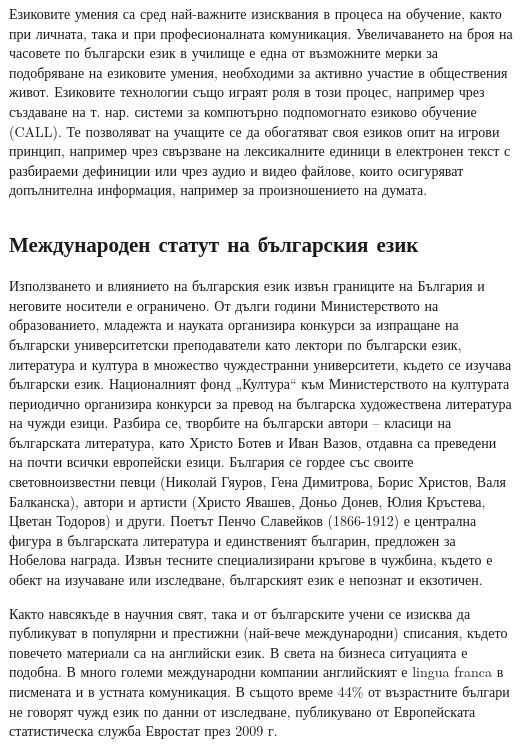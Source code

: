 \documentclass[]{../../metanetpaper}
\begin{document}
\begin{multicols}{2}
Езиковите умения са сред най-важните изисквания в процеса на обучение, както при личната, така и при професионалната комуникация. Увеличаването на броя
 на часовете по български език в училище е една от
 възможните мерки за подобряване на езиковите умения, необходими за активно участие в
 обществения живот. Езиковите технологии също играят роля в
 този процес, например чрез създаване на т. нар. системи
 за компютърно подпомогнато езиково обучение (CALL).
 Те позволяват на учащите се да обогатяват своя езиков
 опит на игрови принцип, например чрез свързване на
 лексикалните единици в електронен текст с разбираеми
 дефиниции или
 чрез аудио и видео файлове, които
 осигуряват допълнителна информация, например за произношението на думата. 

\subsection{Международен статут на българския език}

Използването и влиянието на българския език извън границите на България и неговите носители е ограничено. От дълги години Министерството на образованието, младежта и науката организира конкурси за изпращане на български университетски преподаватели като лектори по български език, литература и култура в множество чуждестранни университети, където се изучава български език. Националният фонд „Култура“ към Министерството на културата периодично организира конкурси за превод на българска художествена литература на чужди езици. Разбира се, творбите на български автори -- класици на българската литература, като Христо Ботев и Иван Вазов, отдавна са преведени на почти всички европейски езици. 
България се гордее със своите световноизвестни певци (Николай Гяуров,
 Гена Димитрова, Борис Христов, Валя Балканска), автори и артисти (Христо Явашев, Доньо Донев, Юлия Кръстева, Цветан Тодоров) и други. Поетът Пенчо Славейков (1866-1912) е централна фигура в българската литература и единственият българин, предложен за Нобелова награда. Извън тесните специализирани кръгове в чужбина, където е обект на изучаване или изследване, българският език е непознат и екзотичен. 


Както навсякъде в научния свят, така и от българските учени се изисква да публикуват в популярни и престижни (най-вече международни) списания, където повечето материали са на английски език. В света на бизнеса ситуацията е подобна. В много големи международни компании английският е lingua franca в писмената и в устната комуникация. В същото време 44\% от възрастните българи не говорят чужд език по данни от изследване, публикувано от Европейската статистическа служба Евростат \cite{epp} през 2009 г.


\end{multicols}
\end{document}
